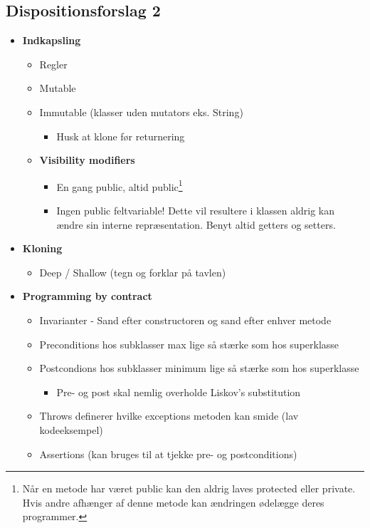 \subsection{Dispositionsforslag 2}

\begin{itemize}
    \item \textbf{Indkapsling}
    \begin{itemize}
        \item Regler
        \item Mutable
        \item Immutable (klasser uden mutators eks. String)
        \begin{itemize}
            \item Husk at klone før returnering
        \end{itemize}
        \item \textbf{Visibility modifiers}
        \begin{itemize}
            \item En gang public, altid public\footnote{Når en metode har været public kan den aldrig laves protected eller private. Hvis andre afhænger af denne metode kan ændringen ødelægge deres programmer.}
            \item Ingen public feltvariable! Dette vil resultere i klassen aldrig kan ændre sin interne repræsentation. Benyt altid getters og setters.
        \end{itemize}
    \end{itemize}
    
    \item \textbf{Kloning}
    \begin{itemize}
        \item Deep / Shallow (tegn og forklar på tavlen)
    \end{itemize}
    
    \item \textbf{Programming by contract}
    \begin{itemize}
        \item Invarianter - Sand efter constructoren og sand efter enhver metode
        \item Preconditions hos subklasser max lige så stærke som hos superklasse
        \item Postcondions hos subklasser minimum lige så stærke som hos superklasse
        \begin{itemize}
            \item Pre- og post skal nemlig overholde Liskov’s substitution
        \end{itemize}
        
        \item Throws definerer hvilke exceptions metoden kan smide (lav kodeeksempel)
        \item Assertions (kan bruges til at tjekke pre- og postconditions)
    \end{itemize}
\end{itemize}
